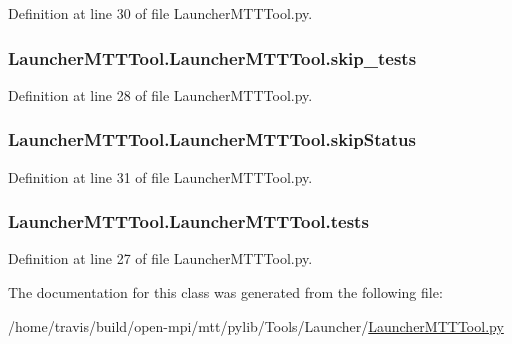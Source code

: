 Definition at line 30 of file Launcher\-M\-T\-T\-Tool.\-py.

\hypertarget{class_launcher_m_t_t_tool_1_1_launcher_m_t_t_tool_a03696ab743c22417d3be183903c20a68}{
\subsubsection[{skip\-\_\-tests}]{\setlength{\rightskip}{0pt plus 5cm}Launcher\-M\-T\-T\-Tool.\-Launcher\-M\-T\-T\-Tool.\-skip\-\_\-tests}}\label{class_launcher_m_t_t_tool_1_1_launcher_m_t_t_tool_a03696ab743c22417d3be183903c20a68}


Definition at line 28 of file Launcher\-M\-T\-T\-Tool.\-py.

\hypertarget{class_launcher_m_t_t_tool_1_1_launcher_m_t_t_tool_a4d5ba97c121703a52364ba25f4a2546b}{
\subsubsection[{skip\-Status}]{\setlength{\rightskip}{0pt plus 5cm}Launcher\-M\-T\-T\-Tool.\-Launcher\-M\-T\-T\-Tool.\-skip\-Status}}\label{class_launcher_m_t_t_tool_1_1_launcher_m_t_t_tool_a4d5ba97c121703a52364ba25f4a2546b}


Definition at line 31 of file Launcher\-M\-T\-T\-Tool.\-py.

\hypertarget{class_launcher_m_t_t_tool_1_1_launcher_m_t_t_tool_a2810a82208a2846540adffee0a6855f7}{
\subsubsection[{tests}]{\setlength{\rightskip}{0pt plus 5cm}Launcher\-M\-T\-T\-Tool.\-Launcher\-M\-T\-T\-Tool.\-tests}}\label{class_launcher_m_t_t_tool_1_1_launcher_m_t_t_tool_a2810a82208a2846540adffee0a6855f7}


Definition at line 27 of file Launcher\-M\-T\-T\-Tool.\-py.



The documentation for this class was generated from the following file\-:\begin{DoxyCompactItemize}
\item 
/home/travis/build/open-\/mpi/mtt/pylib/\-Tools/\-Launcher/\hyperlink{_launcher_m_t_t_tool_8py}{Launcher\-M\-T\-T\-Tool.\-py}\end{DoxyCompactItemize}

